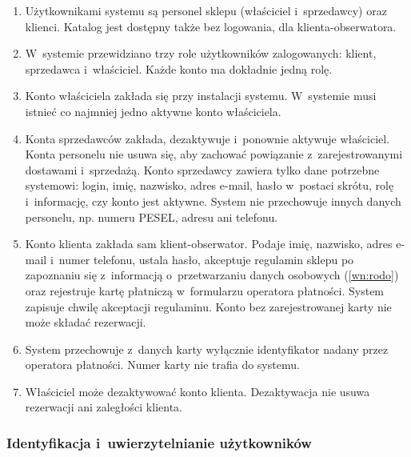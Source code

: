 \documentclass[12pt,a4paper,oneside]{article}
\newcounter{pu}
\begin{document}
\begin{enumerate}[label=WF\arabic*.,ref=WF\arabic*,series=wf,leftmargin=1.6cm]
	\item \label{wf:uzytkownicy} Użytkownikami systemu są personel sklepu (właściciel i~sprzedawcy) oraz klienci. Katalog jest dostępny także bez logowania, dla klienta-obserwatora.
	\item \label{wf:role} W~systemie przewidziano trzy role użytkowników zalogowanych: klient, sprzedawca i~właściciel. Każde konto ma dokładnie jedną rolę.
	\item \label{wf:konto-wlasciciela} Konto właściciela zakłada się przy instalacji systemu. W~systemie musi istnieć co najmniej jedno aktywne konto właściciela.
	\item \label{wf:konta-sprzedawcow} Konta sprzedawców zakłada, dezaktywuje i~ponownie aktywuje właściciel. Konta personelu nie usuwa się, aby zachować powiązanie z~zarejestrowanymi dostawami i~sprzedażą. Konto sprzedawcy zawiera tylko dane potrzebne systemowi: login, imię, nazwisko, adres e-mail, hasło w~postaci skrótu, rolę i~informację, czy konto jest aktywne. System nie przechowuje innych danych personelu, np. numeru PESEL, adresu ani telefonu.
	\item \label{wf:rejestracja} Konto klienta zakłada sam klient-obserwator. Podaje imię, nazwisko, adres e-mail i~numer telefonu, ustala hasło, akceptuje regulamin sklepu po zapoznaniu się z~informacją o~przetwarzaniu danych osobowych (\ref{wn:rodo}) oraz rejestruje kartę płatniczą w~formularzu operatora płatności. System zapisuje chwilę akceptacji regulaminu. Konto bez zarejestrowanej karty nie może składać rezerwacji.
	\item \label{wf:karta} System przechowuje z~danych karty wyłącznie identyfikator nadany przez operatora płatności. Numer karty nie trafia do systemu.
	\item \label{wf:dezaktywacja-klienta} Właściciel może dezaktywować konto klienta. Dezaktywacja nie usuwa rezerwacji ani zaległości klienta.
\end{enumerate}

\subsubsection{Identyfikacja i~uwierzytelnianie użytkowników}
\end{document}
